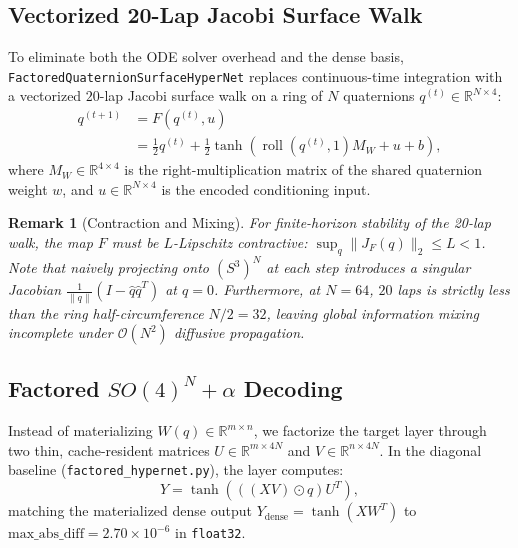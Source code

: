 \documentclass[11pt,twocolumn]{article}
\newtheorem{remark}{Remark}
\begin{document}
\subsection{Vectorized 20-Lap Jacobi Surface Walk}
To eliminate both the ODE solver overhead and the dense basis, \texttt{FactoredQuaternionSurfaceHyperNet} replaces continuous-time integration with a vectorized $20$-lap Jacobi surface walk on a ring of $N$ quaternions $q^{(t)} \in \mathbb{R}^{N \times 4}$:
\begin{equation}
\begin{aligned}
q^{(t+1)} &= F(q^{(t)}, u) \\
&= \frac{1}{2} q^{(t)} + \frac{1}{2}\tanh\!\left(\operatorname{roll}(q^{(t)}, 1) M_W + u + b\right),
\end{aligned}
\end{equation}
where $M_W \in \mathbb{R}^{4 \times 4}$ is the right-multiplication matrix of the shared quaternion weight $w$, and $u \in \mathbb{R}^{N \times 4}$ is the encoded conditioning input.

\begin{remark}[Contraction and Mixing]
For finite-horizon stability of the 20-lap walk, the map $F$ must be $L$-Lipschitz contractive: $\sup_q \|J_F(q)\|_2 \le L < 1$. Note that naively projecting onto $(S^3)^N$ at each step introduces a singular Jacobian $\frac{1}{\|q\|}(I - \hat{q}\hat{q}^T)$ at $q=0$. Furthermore, at $N=64$, $20$ laps is strictly less than the ring half-circumference $N/2 = 32$, leaving global information mixing incomplete under $\mathcal{O}(N^2)$ diffusive propagation.
\end{remark}

\subsection{Factored $SO(4)^N + \alpha$ Decoding}
Instead of materializing $W(q) \in \mathbb{R}^{m \times n}$, we factorize the target layer through two thin, cache-resident matrices $U \in \mathbb{R}^{m \times 4N}$ and $V \in \mathbb{R}^{n \times 4N}$. In the diagonal baseline (\texttt{factored\_hypernet.py}), the layer computes:
\begin{equation}
Y = \tanh\!\left(((X V) \odot q) U^T\right),
\end{equation}
matching the materialized dense output $Y_{\text{dense}} = \tanh(X W^T)$ to $\text{max\_abs\_diff} = 2.70 \times 10^{-6}$ in \texttt{float32}.
\end{document}
